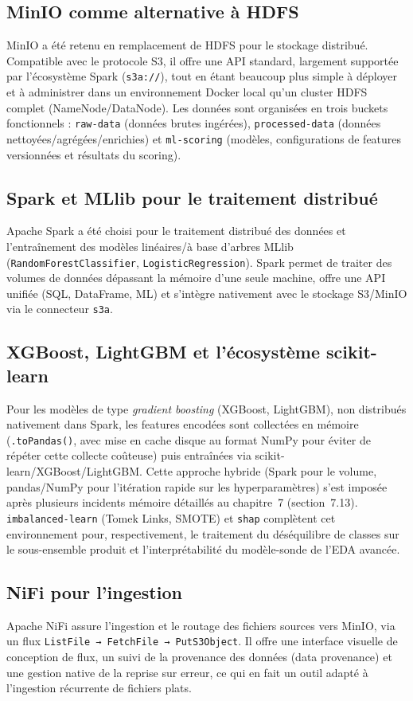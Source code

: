 \documentclass[11pt,a4paper]{report}
\begin{document}
\subsection{MinIO comme alternative à HDFS}
MinIO a été retenu en remplacement de HDFS pour le stockage distribué.
Compatible avec le protocole S3, il offre une API standard, largement
supportée par l'écosystème Spark (\texttt{s3a://}), tout en étant beaucoup
plus simple à déployer et à administrer dans un environnement Docker local
qu'un cluster HDFS complet (NameNode/DataNode). Les données sont organisées
en trois buckets fonctionnels : \texttt{raw-data} (données brutes
ingérées), \texttt{processed-data} (données nettoyées/agrégées/enrichies)
et \texttt{ml-scoring} (modèles, configurations de features versionnées et
résultats du scoring).

\subsection{Spark et MLlib pour le traitement distribué}
Apache Spark a été choisi pour le traitement distribué des données et
l'entraînement des modèles linéaires/à base d'arbres MLlib
(\texttt{RandomForestClassifier}, \texttt{LogisticRegression}). Spark
permet de traiter des volumes de données dépassant la mémoire d'une seule
machine, offre une API unifiée (SQL, DataFrame, ML) et s'intègre
nativement avec le stockage S3/MinIO via le connecteur \texttt{s3a}.

\subsection{XGBoost, LightGBM et l'écosystème scikit-learn}
Pour les modèles de type \textit{gradient boosting} (XGBoost, LightGBM),
non distribués nativement dans Spark, les features encodées sont
collectées en mémoire (\texttt{.toPandas()}, avec mise en cache disque au
format NumPy pour éviter de répéter cette collecte coûteuse) puis
entraînées via scikit-learn/XGBoost/LightGBM. Cette approche hybride
(Spark pour le volume, pandas/NumPy pour l'itération rapide sur les
hyperparamètres) s'est imposée après plusieurs incidents mémoire détaillés
au chapitre~7 (section~7.13). \texttt{imbalanced-learn} (Tomek Links, SMOTE)
et \texttt{shap} complètent cet environnement pour, respectivement, le
traitement du déséquilibre de classes sur le sous-ensemble produit et
l'interprétabilité du modèle-sonde de l'EDA avancée.

\subsection{NiFi pour l'ingestion}
Apache NiFi assure l'ingestion et le routage des fichiers sources vers
MinIO, via un flux \texttt{ListFile → FetchFile → PutS3Object}. Il offre
une interface visuelle de conception de flux, un suivi de la provenance des
données (data provenance) et une gestion native de la reprise sur erreur,
ce qui en fait un outil adapté à l'ingestion récurrente de fichiers plats.
\end{document}
